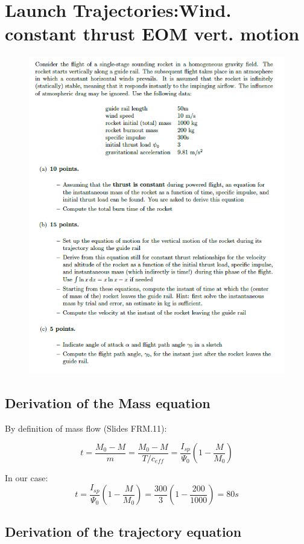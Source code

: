 \section{ Launch Trajectories:Wind. constant thrust EOM vert. motion }\label{sec:q4}    

\begin{figure}[H]
	\centering
	\includegraphics[width=0.80\linewidth]{pics/screenshot003}
	\label{fig:screenshot003}
\end{figure}

\subsection{Derivation of the Mass equation}

By definition of mass flow (Slides FRM.11): 

\begin{equation}
t = \frac{M_0-M}{m} = \frac{M_0-M}{T/c_{eff}}= \frac{I_{sp}}{\Psi_0}(1-\frac{M}{M_0})
\label{eq:1}
\end{equation}

In our case: 
$$ t = \frac{I_{sp}}{\Psi_0}(1-\frac{M}{M_0}) =  \frac{300}{3}(1-\frac{200}{1000}) = 80 s$$
\subsection{Derivation of the trajectory equation}


